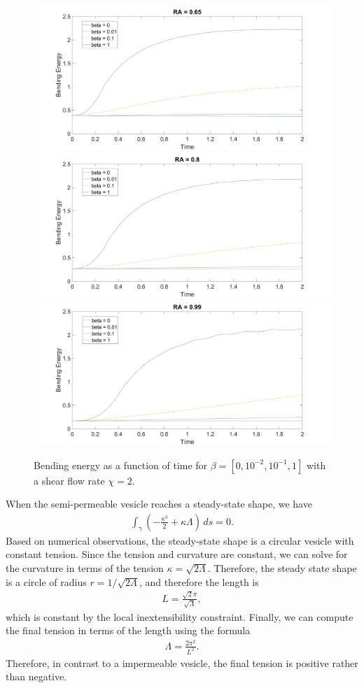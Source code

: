 \documentclass[aps,prl,showpacs]{revtex4}
\begin{document}
 \begin{figure}
 	\centering
 	\includegraphics[width=.9\textwidth]{figures/BE10.jpg}
 	\includegraphics[width=.9\textwidth]{figures/BE11.jpg}
 	\includegraphics[width=.9\textwidth]{figures/BE12.jpg}
 	\caption{Bending energy as a function of time for $\beta = [0, 10^{-2},10^{-1}, 1]$ with a shear flow rate $\chi = 2$.}
 	\label{Shear0}
 \end{figure}

When the semi-permeable vesicle reaches a steady-state shape, we have
\begin{align}
  \int_{\gamma} \left(-\frac{\kappa^3}{2} + \kappa \Lambda \right) \, ds
  = 0.
\end{align}
Based on numerical observations, the steady-state shape is a circular
vesicle with constant tension. Since the tension and curvature are
constant, we can solve for the curvature in terms of the tension $\kappa
= \sqrt{2\Lambda}$. Therefore, the steady state shape is a circle of
radius $r = 1/\sqrt{2\Lambda}$, and therefore the length is
\begin{align}
  L = \frac{\sqrt{2}\pi}{\sqrt{\Lambda}},
\end{align}
which is constant by the local inextensibility constraint. Finally, we
can compute the final tension in terms of the length using the formula
\begin{align}
  \Lambda = \frac{2\pi^2}{L^2}.
\end{align}
Therefore, in contrast to a impermeable vesicle, the final tension is
positive rather than negative.
\end{document}
